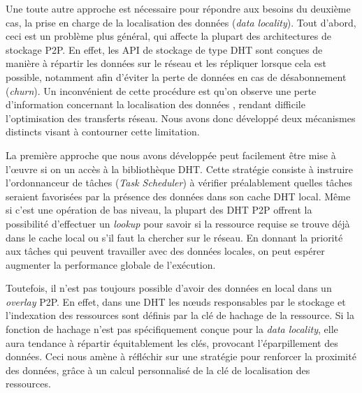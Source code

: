 Une toute autre approche est nécessaire pour répondre aux besoins du deuxième cas, la prise en charge de la localisation des données (\textit{data locality}). Tout d'abord, ceci est un problème plus général, qui affecte la plupart des architectures de stockage P2P. En effet, les API de stockage de type DHT sont conçues de manière à répartir les données sur le réseau et les répliquer lorsque cela est possible, notamment afin d'éviter la perte de données en cas de désabonnement (\textit{churn}). Un inconvénient de cette procédure est qu'on observe une perte d'information concernant la localisation des données \cite{Wu2005}, rendant difficile l'optimisation des transferts réseau. Nous avons donc développé deux mécanismes distincts visant à contourner cette limitation. 

La première approche que nous avons développée peut facilement être mise à l'{\oe}uvre si on un accès à la bibliothèque DHT. Cette stratégie consiste à instruire l'ordonnanceur de tâches (\textit{Task Scheduler}) à vérifier préalablement quelles tâches seraient favorisées par la présence des données dans son cache DHT local. Même si c'est une opération de bas niveau, la plupart des DHT P2P offrent la possibilité d'effectuer un \textit{lookup} pour savoir si la ressource requise se trouve déjà dans le cache local ou s'il faut la chercher sur le réseau. En donnant la priorité aux tâches qui peuvent travailler avec des données locales, on peut espérer augmenter la performance globale de l'exécution.

Toutefois, il n'est pas toujours possible d'avoir des données en local dans un \textit{overlay} P2P. En effet, dans une DHT les n{\oe}uds responsables par le stockage et l'indexation des ressources sont définis par la clé de hachage de la ressource. Si la fonction de hachage n'est pas spécifiquement conçue pour la \textit{data locality}, elle aura tendance à répartir équitablement les clés, provocant l'éparpillement des données.  Ceci nous amène à réfléchir sur une stratégie pour renforcer la proximité des données, grâce à un calcul personnalisé de la clé de localisation des ressources. 

%
%

